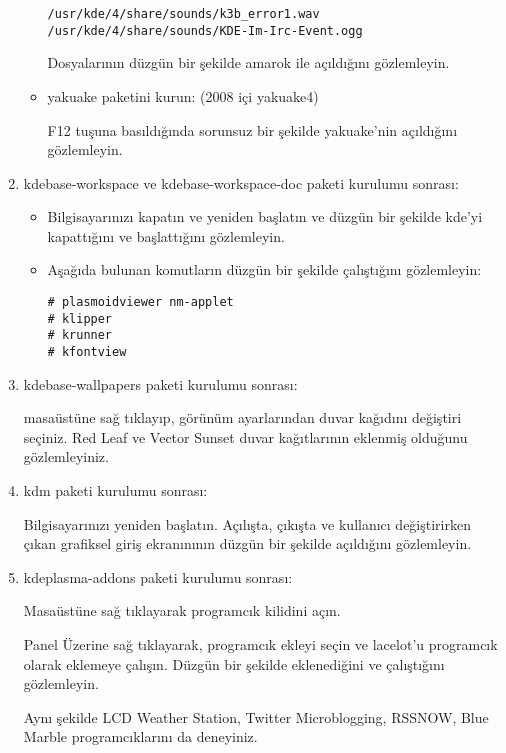 \documentclass[a4paper,10pt]{article}
\begin{document}
\begin{enumerate}
\begin{itemize}
\begin{verbatim}
/usr/kde/4/share/sounds/k3b_error1.wav
/usr/kde/4/share/sounds/KDE-Im-Irc-Event.ogg
\end{verbatim}

Dosyalarının düzgün bir şekilde amarok ile açıldığını gözlemleyin.

\item yakuake paketini kurun: (2008 içi yakuake4)

F12 tuşuna basıldığında sorunsuz bir şekilde yakuake'nin açıldığını gözlemleyin.
\end{itemize}
\item kdebase-workspace ve kdebase-workspace-doc paketi kurulumu sonrası:
\begin{itemize}

 \item Bilgisayarınızı kapatın ve yeniden başlatın ve düzgün bir şekilde kde'yi kapattığını ve başlattığını gözlemleyin.

 \item Aşağıda bulunan komutların düzgün bir şekilde çalıştığını gözlemleyin:
\begin{verbatim}
# plasmoidviewer nm-applet 
# klipper
# krunner
# kfontview
\end{verbatim}

\end{itemize}

\item kdebase-wallpapers paketi kurulumu sonrası:

masaüstüne sağ tıklayıp, görünüm ayarlarından duvar kağıdını değiştiri seçiniz. Red Leaf ve Vector Sunset duvar kağıtlarının eklenmiş olduğunu gözlemleyiniz.

\item kdm paketi kurulumu sonrası:

Bilgisayarınızı yeniden başlatın. Açılışta, çıkışta ve kullanıcı değiştirirken çıkan grafiksel giriş ekranınının düzgün bir şekilde açıldığını gözlemleyin.

\item kdeplasma-addons paketi kurulumu sonrası:

Masaüstüne sağ tıklayarak programcık kilidini açın.

Panel Üzerine sağ tıklayarak, programcık ekleyi seçin ve lacelot'u programcık olarak eklemeye çalışın. Düzgün bir şekilde eklenediğini ve çalıştığını gözlemleyin.

Aynı şekilde LCD Weather Station, Twitter Microblogging, RSSNOW, Blue Marble programcıklarını da deneyiniz.


\end{enumerate}
\end{document}
